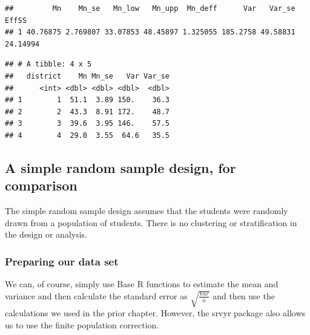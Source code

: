\documentclass[
]{article}
\newenvironment{Shaded}{\begin{snugshade}}{\end{snugshade}}
\newcommand{\CommentTok}[1]{\textcolor[rgb]{0.56,0.35,0.01}{\textit{#1}}}
\newcommand{\DataTypeTok}[1]{\textcolor[rgb]{0.13,0.29,0.53}{#1}}
\newcommand{\KeywordTok}[1]{\textcolor[rgb]{0.13,0.29,0.53}{\textbf{#1}}}
\newcommand{\NormalTok}[1]{#1}
\newcommand{\OperatorTok}[1]{\textcolor[rgb]{0.81,0.36,0.00}{\textbf{#1}}}
\newcommand{\StringTok}[1]{\textcolor[rgb]{0.31,0.60,0.02}{#1}}
\begin{document}
\begin{verbatim}
##         Mn    Mn_se   Mn_low   Mn_upp  Mn_deff      Var   Var_se    EffSS
## 1 40.76875 2.769807 33.07853 48.45897 1.325055 185.2758 49.58831 24.14994
\end{verbatim}

\begin{Shaded}
\end{Shaded}

\begin{verbatim}
## # A tibble: 4 x 5
##   district    Mn Mn_se   Var Var_se
##      <int> <dbl> <dbl> <dbl>  <dbl>
## 1        1  51.1  3.89 150.    36.3
## 2        2  43.3  8.91 172.    48.7
## 3        3  39.6  3.95 146.    57.5
## 4        4  29.0  3.55  64.6   35.5
\end{verbatim}

\hypertarget{a-simple-random-sample-design-for-comparison}{%
\subsection{A simple random sample design, for comparison}\label{a-simple-random-sample-design-for-comparison}}

The simple random sample design assumes that the students were randomly drawn from a population of students. There is no clustering or stratification in the design or analysis.

\hypertarget{preparing-our-data-set-1}{%
\subsubsection{Preparing our data set}\label{preparing-our-data-set-1}}

We can, of course, simply use Base R functions to estimate the mean and variance and then calculate the standard error as \(\sqrt{\frac{Var}{n}}\) and then use the calculations we used in the prior chapter. However, the srvyr package also allows us to use the finite population correction.
\end{document}
